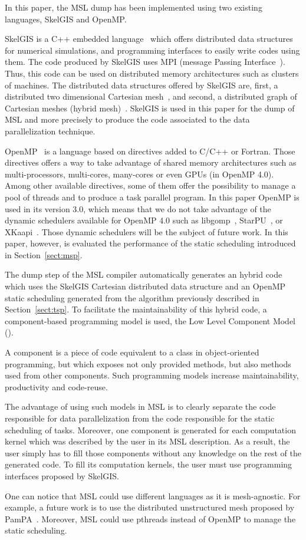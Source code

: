 In this paper, the MSL dump has been implemented using two existing languages, SkelGIS and OpenMP.

SkelGIS is a C++ embedded language~\cite{} which offers distributed data structures for numerical simulations, and programming interfaces to easily write codes using them. The code produced by SkelGIS uses MPI (message Passing Interface~\cite{}). Thus, this code can be used on distributed memory architectures such as clusters of machines. The distributed data structures offered by SkelGIS are, first, a distributed two dimensional Cartesian mesh~\cite{}, and second, a distributed graph of Cartesian meshes (hybrid mesh)~\cite{}. SkelGIS is used in this paper for the dump of MSL and more precisely to produce the code associated to the data parallelization technique.

OpenMP~\cite{} is a language based on directives added to C/C++ or Fortran. Those directives offers a way to take advantage of shared memory architectures such as multi-processors, multi-cores, many-cores or even GPUs (in OpenMP 4.0). Among other available directives, some of them offer the possibility to manage a pool of threads and to produce a task parallel program. In this paper OpenMP is used in its version 3.0, which means that we do not take advantage of the dynamic schedulers available for OpenMP 4.0 such as libgomp~\cite{}, StarPU~\cite{}, or XKaapi~\cite{}. Those dynamic schedulers will be the subject of future work. In this paper, however, is evaluated the performance of the static scheduling introduced in Section~\ref{sect:msp}.

The dump step of the MSL compiler automatically generates an hybrid code which uses the SkelGIS Cartesian distributed data structure and an OpenMP static scheduling generated from the algorithm previously described in Section~\ref{sect:tsp}. To facilitate the maintainability of this hybrid code, a component-based programming model is used, the Low Level Component Model~\cite{} (\llc). 

A component is a piece of code equivalent to a class in object-oriented programming, but which exposes not only provided methods, but also methods used from other components. Such programming models increase maintainability, productivity and code-reuse.

The advantage of using such models in MSL is to clearly separate the code responsible for data parallelization from the code responsible for the static scheduling of tasks. Moreover, one component is generated for each computation kernel which was described by the user in its MSL description. As a result, the user simply has to fill those components without any knowledge on the rest of the generated code. To fill its computation kernels, the user must use programming interfaces proposed by SkelGIS.

One can notice that MSL could use different languages as it is mesh-agnostic. For example, a future work is to use the distributed unstructured mesh proposed by PamPA~\cite{}. Moreover, MSL could use pthreads instead of OpenMP to manage the static scheduling.

